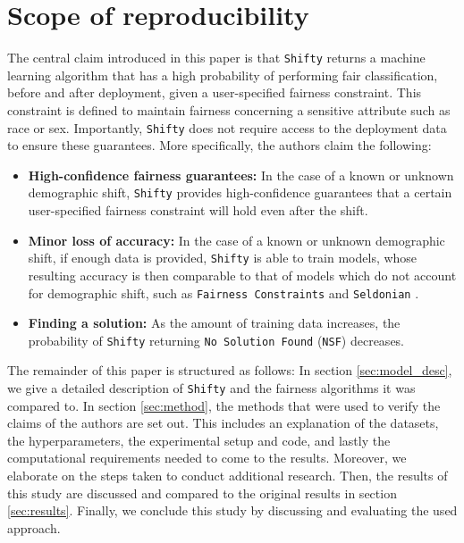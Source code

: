 \section{Scope of reproducibility}
\label{sec:claims}
The central claim introduced in this paper is that \texttt{Shifty} returns a machine learning algorithm that has a high probability of performing fair classification, before and after deployment, given a user-specified fairness constraint. This constraint is defined to maintain fairness concerning a sensitive attribute such as race or sex. Importantly, \texttt{Shifty} does not require access to the deployment data to ensure these guarantees. More specifically, the authors claim the following:
\begin{itemize}
    \item \textbf{High-confidence fairness guarantees:} In the case of a known or unknown demographic shift, \texttt{Shifty} provides high-confidence guarantees that a certain user-specified fairness constraint will hold even after the shift.
    
    \item \textbf{Minor loss of accuracy:} In the case of a known or unknown demographic shift, if enough data is provided, \texttt{Shifty} is able to train models, whose resulting accuracy is then comparable to that of models which do not account for demographic shift, such as \texttt{Fairness Constraints} \cite{zafar2017fairness} and \texttt{Seldonian} \cite{thomas2019preventing}. 
    
    \item \textbf{Finding a solution:} As the amount of training data increases, the probability of \texttt{Shifty} returning \verb|No Solution Found| (\verb|NSF|) decreases.

\end{itemize}

The remainder of this paper is structured as follows: In section \ref{sec:model_desc}, we give a detailed description of \texttt{Shifty} and the fairness algorithms it was compared to. In section \ref{sec:method}, the methods that were used to verify the claims of the authors are set out. This includes an explanation of the datasets, the hyperparameters, the experimental setup and code, and lastly the computational requirements needed to come to the results. Moreover, we elaborate on the steps taken to conduct additional research. Then, the results of this study are discussed and compared to the original results in section \ref{sec:results}. Finally, we conclude this study by discussing and evaluating the used approach.


